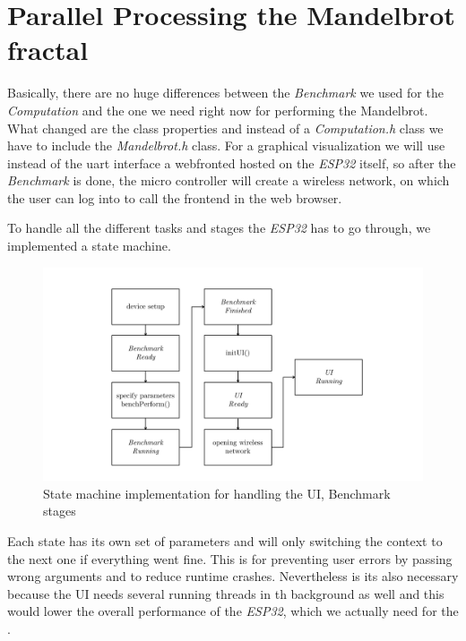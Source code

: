 \newpage

\section{Parallel Processing the Mandelbrot fractal}

Basically, there are no huge differences between the \textit{Benchmark} we used for the \textit{Computation} and the one we need right now for performing the Mandelbrot. What changed are the class properties and instead of a \textit{Computation.h} class we have to include the \textit{Mandelbrot.h} class. For a graphical visualization we will use instead of the uart interface a webfronted hosted on the \textit{ESP32} itself, so after the \textit{Benchmark} is done, the micro controller will create a wireless network, on which the user can log into to call the frontend in the web browser.

To handle all the different tasks and stages the \textit{ESP32} has to go through, we implemented a state machine.

\begin{figure}[htbp]
	\centerline{\includegraphics[width=1.1\linewidth]{images/State-Machine.pdf}}
	\caption{ State machine implementation for handling the UI, Benchmark stages }
	\label{fig:stateMachine}
\end{figure}  

Each state has its own set of parameters and will only switching the context to the next one if everything went fine. This is for preventing user errors by passing wrong arguments and to reduce runtime crashes. Nevertheless is its also necessary because the UI needs several running threads in th background as well and this would lower the overall performance of the \textit{ESP32}, which we actually need for the .\\   

